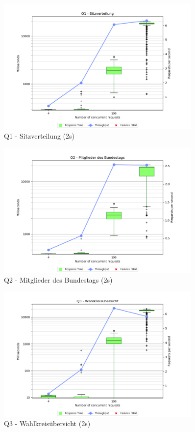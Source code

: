 \documentclass[a4paper]{scrreprt}
\begin{document}
\begin{figure}[htb!]
	\centering
	\includegraphics[width=0.9\textwidth]{images/plots_2s/Q1}
	\caption {Q1 - Sitzverteilung (2s)}
\end{figure}

\begin{figure}[htb!]
	\centering
	\includegraphics[width=0.9\textwidth]{images/plots_2s/Q2}
	\caption {Q2 - Mitglieder des Bundestags (2s)}
\end{figure}

\begin{figure}[htb!]
	\centering
	\includegraphics[width=0.9\textwidth]{images/plots_2s/Q3}
	\caption {Q3 - Wahlkreisübersicht (2s)}
\end{figure}
\end{document}

